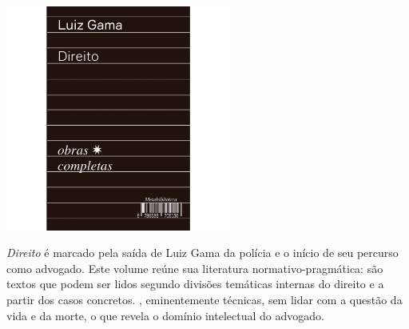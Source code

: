 

\begin{center}
\hspace*{.5cm}\includegraphics[width=74mm]{./CAPAS/HEDRA_DIREITO.jpg}
\end{center}
\hspace*{-7cm}\hrulefill\hspace*{-7cm}
\medskip

\noindent{}\textit{Direito} é marcado pela saída de Luiz Gama da polícia e o início de seu percurso como advogado. Este volume reúne sua literatura normativo-pragmática: são textos que podem ser lidos segundo divisões temáticas internas do direito e a partir dos casos concretos. , eminentemente técnicas, sem lidar com a questão da vida e da morte, o que revela o domínio intelectual do advogado.

